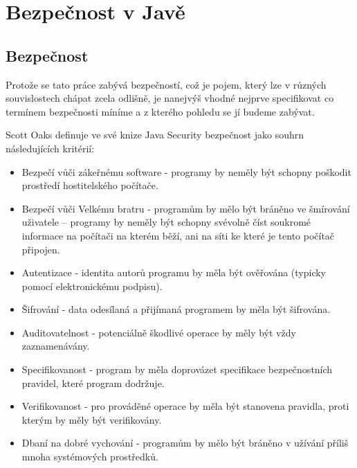 
\chapter{Bezpečnost v Javě} \label{teoretickyUvod}

\section{Bezpečnost}

Protože se tato práce zabývá bezpečností, což je pojem, který lze v různých souvislostech chápat zcela odlišně, je nanejvýš vhodné nejprve specifikovat co termínem bezpečnosti míníme a z kterého pohledu se jí budeme zabývat.

Scott Oaks definuje ve své knize Java Security bezpečnost jako souhrn následujících kritérií: \cite[1.1]{oaks}

\begin{itemize}
  \item Bezpečí vůči zákeřnému software - programy by neměly být schopny poškodit prostředí hostitelského počítače.
  \item Bezpečí vůči Velkému bratru - programům by mělo být bráněno ve šmírování uživatele -- programy by neměly být schopny svévolně číst soukromé informace na počítači na kterém běží, ani na síti ke které je tento počítač připojen.
  \item Autentizace - identita autorů programu by měla být ověřována (typicky pomocí elektronickému podpisu).
  \item Šifrování - data odesílaná a přijímaná programem by měla být šifrována.
  \item Auditovatelnost - potenciálně škodlivé operace by měly být vždy zaznamenávány.
  \item Specifikovanost - program by měla doprovázet specifikace bezpečnostních pravidel, které program dodržuje.
  \item Verifikovanost - pro prováděné operace by měla být stanovena pravidla, proti kterým by měly být verifikovány.
  \item Dbaní na dobré vychování - programům by mělo být bráněno v užívání příliš mnoha systémových prostředků.
\end{itemize}

